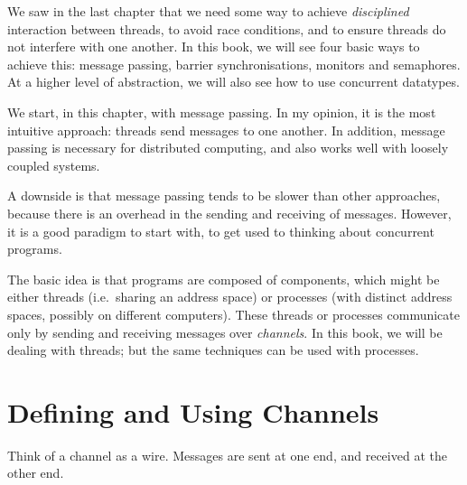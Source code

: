 We saw in the last chapter that we need some way to achieve
\emph{disciplined} interaction between threads, to avoid race conditions, and
to ensure threads do not interfere with one another.  In this book, we will
see four basic ways to achieve this: message passing, barrier
synchronisations, monitors and semaphores.  At a higher level of abstraction,
we will also see how to use concurrent datatypes.

We start, in this chapter, with message passing.  In my opinion, it is the
most intuitive approach: threads send messages to one another.  In addition,
message passing is necessary for distributed computing, and also works well
with loosely coupled systems.

A downside is that message passing tends to be slower than other approaches,
because there is an overhead in the sending and receiving of messages.
However, it is a good paradigm to start with, to get used to thinking about
concurrent programs.

The basic idea is that programs are composed of components, which might be
either threads (i.e.~sharing an address space) or processes (with distinct
address spaces, possibly on different computers).  These threads or processes
communicate only by sending and receiving messages over \emph{channels}.  In
this book, we will be dealing with threads; but the same techniques can be
used with processes.


\section{Defining and Using Channels}

Think of a channel as a wire.  Messages are sent at one end,
and received at the other end.



